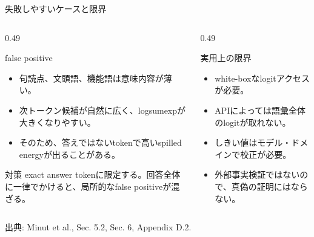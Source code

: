 \documentclass[dvipdfmx,uplatex,unicode,9pt,aspectratio=169]{beamer}
\newcommand{\source}[1]{\vfill{\tiny\color{GrayText}出典: #1}}
\begin{document}
\begin{frame}{失敗しやすいケースと限界}
\begin{columns}[T,onlytextwidth]
\begin{column}{0.49\linewidth}
\begin{block}{false positive}
\begin{itemize}
\item 句読点、文頭語、機能語は意味内容が薄い。
\item 次トークン候補が自然に広く、logsumexpが大きくなりやすい。
\item そのため、答えではないtokenで高いspilled energyが出ることがある。
\end{itemize}
\end{block}
\begin{block}{対策}
exact answer tokenに限定する。回答全体に一律でかけると、局所的なfalse positiveが混ざる。
\end{block}
\end{column}
\begin{column}{0.49\linewidth}
\begin{block}{実用上の限界}
\begin{itemize}
\item white-boxなlogitアクセスが必要。
\item APIによっては語彙全体のlogitが取れない。
\item しきい値はモデル・ドメインで校正が必要。
\item 外部事実検証ではないので、真偽の証明にはならない。
\end{itemize}
\end{block}
\begin{center}
\end{center}
\end{column}
\end{columns}
\source{Minut et al., Sec. 5.2, Sec. 6, Appendix D.2.}
\end{frame}
\end{document}

